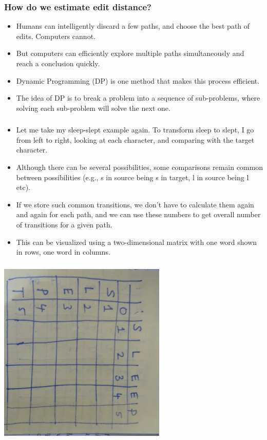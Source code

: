 \documentclass{beamer}
\begin{document}
\begin{frame}
\frametitle{How do we estimate edit distance?}
\begin{itemize}
\item Humans can intelligently discard a few paths, and choose the best path of edits. Computers cannot. 
\item But computers can efficiently explore multiple paths simultaneously and reach a conclusion quickly. 
\item Dynamic Programming (DP) is one method that makes this process efficient.
\item The idea of DP is to break a problem into a sequence of sub-problems, where solving each sub-problem will solve the next one. 
\end{itemize}
\end{frame}

\begin{frame}
\frametitle{}
\begin{itemize}
\item Let me take my sleep-slept example again. To transform sleep to slept, I go from left to right, looking at each character, and comparing with the target character. 
\item Although there can be several possibilities, some comparisons remain common between possibilities (e.g., s in source being s in target, l in source being l etc).
\item If we store such common transitions, we don't have to calculate them again and again for each path, and we can use these numbers to get overall number of transitions for a given path. 
\item This can be visualized using a two-dimensional matrix with one word shown in rows, one word in columns. 
\end{itemize}
\end{frame}

\begin{frame}
\frametitle{}
\includegraphics[width=0.6\textwidth,angle=90]{leven0.jpg}
\end{frame}
\end{document}
